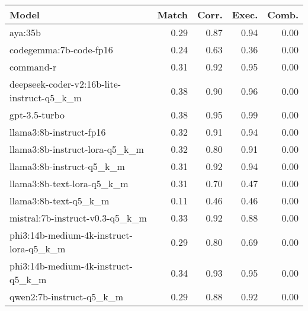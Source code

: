 \begin{tabular}{lrrrr}
\toprule
Model & Match & Corr. & Exec. & Comb. \\
\midrule
aya:35b & 0.29 & 0.87 & 0.94 & 0.00 \\
codegemma:7b-code-fp16 & 0.24 & 0.63 & 0.36 & 0.00 \\
command-r & 0.31 & 0.92 & 0.95 & 0.00 \\
deepseek-coder-v2:16b-lite-instruct-q5\_k\_m & 0.38 & 0.90 & 0.96 & 0.00 \\
gpt-3.5-turbo & 0.38 & 0.95 & 0.99 & 0.00 \\
llama3:8b-instruct-fp16 & 0.32 & 0.91 & 0.94 & 0.00 \\
llama3:8b-instruct-lora-q5\_k\_m & 0.32 & 0.80 & 0.91 & 0.00 \\
llama3:8b-instruct-q5\_k\_m & 0.31 & 0.92 & 0.94 & 0.00 \\
llama3:8b-text-lora-q5\_k\_m & 0.31 & 0.70 & 0.47 & 0.00 \\
llama3:8b-text-q5\_k\_m & 0.11 & 0.46 & 0.46 & 0.00 \\
mistral:7b-instruct-v0.3-q5\_k\_m & 0.33 & 0.92 & 0.88 & 0.00 \\
phi3:14b-medium-4k-instruct-lora-q5\_k\_m & 0.29 & 0.80 & 0.69 & 0.00 \\
phi3:14b-medium-4k-instruct-q5\_k\_m & 0.34 & 0.93 & 0.95 & 0.00 \\
qwen2:7b-instruct-q5\_k\_m & 0.29 & 0.88 & 0.92 & 0.00 \\
\bottomrule
\end{tabular}

